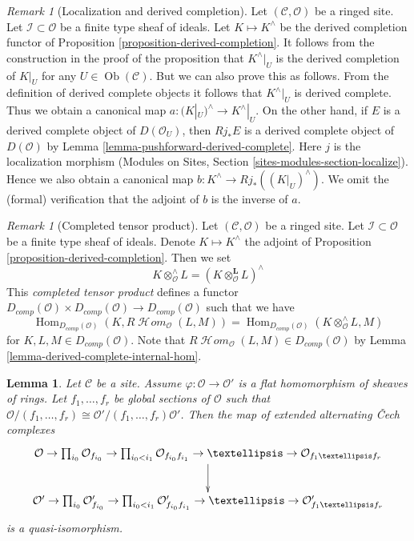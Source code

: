 \documentclass{stacks-project}
\theoremstyle{plain}
\newtheorem{lemma}[subsection]{Lemma}
\theoremstyle{definition}
\theoremstyle{remark}
\newtheorem{remark}[subsection]{Remark}
\numberwithin{equation}{subsection}
\def\Hom{\mathop{\mathrm{Hom}}\nolimits}
\def\SheafHom{\mathop{\mathcal{H}\!\mathit{om}}\nolimits}
\def\Ob{\mathop{\mathrm{Ob}}\nolimits}
\begin{document}
\begin{remark}[Localization and derived completion]
\label{remark-localization-and-completion}
Let $(\mathcal{C}, \mathcal{O})$ be a ringed site.
Let $\mathcal{I} \subset \mathcal{O}$ be a finite type sheaf of
ideals. Let $K \mapsto K^\wedge$ be the derived completion functor
of Proposition \ref{proposition-derived-completion}. It follows
from the construction in the proof of the proposition that $K^\wedge|_U$
is the derived completion of $K|_U$ for any $U \in \Ob(\mathcal{C})$.
But we can also prove this as follows. From the definition
of derived complete objects it follows that $K^\wedge|_U$ is derived complete.
Thus we obtain a canonical map $a : (K|_U)^\wedge \to K^\wedge|_U$.
On the other hand, if $E$ is a derived complete object of
$D(\mathcal{O}_U)$, then $Rj_*E$ is a derived complete object of
$D(\mathcal{O})$ by Lemma \ref{lemma-pushforward-derived-complete}.
Here $j$ is the localization morphism
(Modules on Sites, Section \ref{sites-modules-section-localize}).
Hence we also obtain a canonical
map $b : K^\wedge \to Rj_*((K|_U)^\wedge)$. We omit the (formal) verification
that the adjoint of $b$ is the inverse of $a$.
\end{remark}

\begin{remark}[Completed tensor product]
\label{remark-completed-tensor-product}
Let $(\mathcal{C}, \mathcal{O})$ be a ringed site. Let
$\mathcal{I} \subset \mathcal{O}$ be a finite type sheaf of ideals. 
Denote $K \mapsto K^\wedge$ the adjoint of
Proposition \ref{proposition-derived-completion}.
Then we set
$$
K \otimes^\wedge_\mathcal{O} L = (K \otimes_\mathcal{O}^\mathbf{L} L)^\wedge
$$
This {\it completed tensor product} defines a functor
$D_{comp}(\mathcal{O}) \times D_{comp}(\mathcal{O}) \to D_{comp}(\mathcal{O})$
such that we have
$$
\Hom_{D_{comp}(\mathcal{O})}(K, R\SheafHom_\mathcal{O}(L, M))
=
\Hom_{D_{comp}(\mathcal{O})}(K \otimes_\mathcal{O}^\wedge L, M)
$$
for $K, L, M \in D_{comp}(\mathcal{O})$. Note that
$R\SheafHom_\mathcal{O}(L, M) \in D_{comp}(\mathcal{O})$ by
Lemma \ref{lemma-derived-complete-internal-hom}.
\end{remark}

\begin{lemma}
\label{lemma-map-identifies-koszul-and-cech-complexes}
Let $\mathcal{C}$ be a site.
Assume $\varphi : \mathcal{O} \to \mathcal{O}'$ is a flat homomorphism
of sheaves of rings. Let $f_1, \ldots, f_r$ be global sections
of $\mathcal{O}$ such that $\mathcal{O}/(f_1, \ldots, f_r) \cong
\mathcal{O}'/(f_1, \ldots, f_r)\mathcal{O}'$.
Then the map of extended alternating {\v C}ech complexes
$$
\xymatrix{
\mathcal{O} \to
\prod_{i_0} \mathcal{O}_{f_{i_0}} \to
\prod_{i_0 < i_1} \mathcal{O}_{f_{i_0}f_{i_1}} \to \ldots \to
\mathcal{O}_{f_1\ldots f_r} \ar[d] \\
\mathcal{O}' \to
\prod_{i_0} \mathcal{O}'_{f_{i_0}} \to
\prod_{i_0 < i_1} \mathcal{O}'_{f_{i_0}f_{i_1}} \to \ldots \to
\mathcal{O}'_{f_1\ldots f_r}
}
$$
is a quasi-isomorphism.
\end{lemma}
\end{document}

